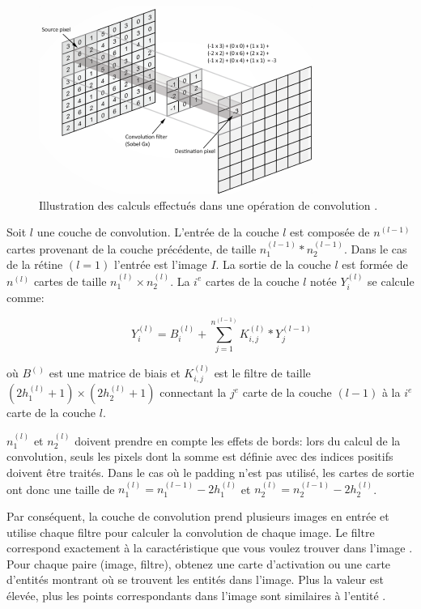 	\begin{figure}[H]%
		\centering
		\includegraphics[width=0.8\textwidth]{images/cnn_kernel_filter}
		\caption[Illustration des calculs effectués dans une opération de convolution.]{Illustration des calculs effectués dans une opération de convolution \cite{antoine2018apprentissage}.}
		\label{fig:cnn_kernel_filter}
	\end{figure}
	Soit $l$ une couche de convolution. L'entrée de la couche $l$ est composée de $n ^ {(l - 1)}$ cartes provenant de la couche précédente, de taille $n_{1} ^ {(l - 1)} * n_{2} ^ {(l - 1)}$. Dans le cas de la rétine $(l = 1)$ l'entrée est l'image $I$. La sortie de la couche $l$ est formée de $n ^ {(l)}$ cartes de taille $n_1 ^ {(l)} \times n_2 ^ {(l)}$. La $i^e$ cartes de la couche $l$ notée $Y_{i} ^ {(l)}$ se calcule comme:
	
	\begin{equation}
		\qquad	Y_i ^ {(l)} =B_i ^ {(l)} + \sum_{j=1}^{n^{(l-1)}} K_{i,j}^{(l)} \ast Y_j^{(l-1)}
	\end{equation}
	
	où $B^{()}$ est une matrice de biais et $K_{i,j}^{(l)}$ est le filtre de taille $(2h_1^{(l)}+1)\times(2h_2^{(l)}+1)$ connectant la $j^e$ carte de la couche $(l-1)$ à la $i^e$ carte de la couche $l$.
	
	$n_{1} ^ {(l)} $ et $ n_{2} ^ {(l)}$ doivent prendre en compte les effets de bords: lors du calcul de la convolution, seuls les pixels dont la somme est définie avec des indices positifs doivent être traités. Dans le cas où le padding n'est pas utilisé, les cartes de sortie ont donc une taille de $n_{1} ^ {(l)} = n_{1} ^ {(l-1)} - 2h_1 ^ {(l)} $ et 
	$ n_{2} ^ {(l)} = n_{2} ^ {(l-1)} - 2h_2 ^ {(l)}$.
	
	
	Par conséquent, la couche de convolution prend plusieurs images en entrée  et utilise chaque filtre pour calculer la convolution de  chaque image. Le filtre correspond exactement à la caractéristique que vous voulez trouver dans l'image \cite{shin2016deep}. 
	Pour chaque paire (image, filtre), obtenez une carte d'activation ou une carte d'entités montrant où se trouvent les entités dans l'image. Plus la valeur est élevée, plus les points correspondants dans l'image sont similaires à l'entité \cite{goodfellow2016deep}.
	
